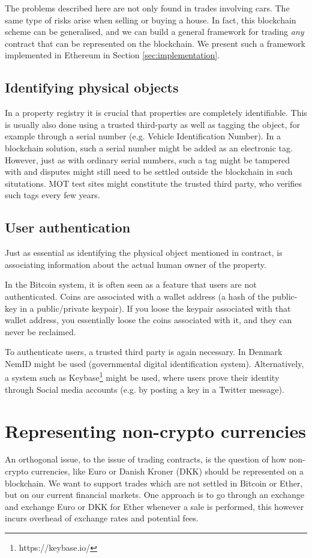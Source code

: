 \documentclass[oneside,a4paper,10pts,article]{memoir}
\begin{document}
The problems described here are not only found in trades involving
cars. The same type of risks arise when selling or buying a house. In
fact, this blockchain scheme can be generalised, and we can build a
general framework for trading \textit{any} contract that can be
represented on the blockchain. We present such a framework implemented
in Ethereum in Section \ref{sec:implementation}.


\section{Identifying physical objects}
In a property registry it is crucial that properties are completely
identifiable. This is usually also done using a trusted third-party as
well as tagging the object, for example through a serial number
(e.g. Vehicle Identification Number). In a blockchain solution, such a
serial number might be added as an electronic tag. However, just as
with ordinary serial numbers, such a tag might be tampered with and
disputes might still need to be settled outside the blockchain in such
situtations. MOT test sites might constitute the trusted third party,
who verifies such tags every few years.

\section{User authentication}
Just as essential as identifying the physical object mentioned in
contract, is associating information about the actual human owner of
the property. 

In the Bitcoin system, it is often seen as a feature that users are
not authenticated. Coins are associated with a wallet address (a hash
of the public-key in a public/private keypair). If you loose the
keypair associated with that wallet address, you essentially loose the
coins associated with it, and they can never be reclaimed.

To authenticate users, a trusted third party is again necessary. In
Denmark NemID might be used (governmental digital identification
system). Alternatively, a system such as
Keybase\footnote{https://keybase.io/} might be used, where users prove
their identity through Social media accounts (e.g. by posting a key in
a Twitter message).

\chapter{Representing non-crypto currencies}
\label{sec:currency}
An orthogonal issue, to the issue of trading contracts, is the
question of how non-crypto currencies, like Euro or Danish Kroner
(DKK) should be represented on a blockchain. We want to support trades
which are not settled in Bitcoin or Ether, but on our current
financial markets. One approach is to go through an exchange and
exchange Euro or DKK for Ether whenever a sale is performed, this
however incurs overhead of exchange rates and potential fees.
\end{document}
